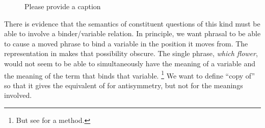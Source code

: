 \documentclass[output=paper]{langsci/langscibook}
\begin{document}
\begin{figure}
\caption{\color{red}Please provide a caption\label{ex:multi1}}
\end{figure}
%

There is evidence that the semantics of constituent questions of this kind must be able to involve a binder/variable relation. In principle, we want phrasal  to be able to cause a moved phrase to bind a variable in the position it moves from. The representation in  makes that possibility obscure. The single phrase, \emph{which flower}, would not seem to be able to simultaneously have the meaning of a variable and the meaning of the term that binds that variable.%
\footnote{But see \cite{Engdahl1986} for a method.} %
We want to define ``copy of'' so that it gives the equivalent of  for antisymmetry, but not for the meanings involved.
\end{document}
